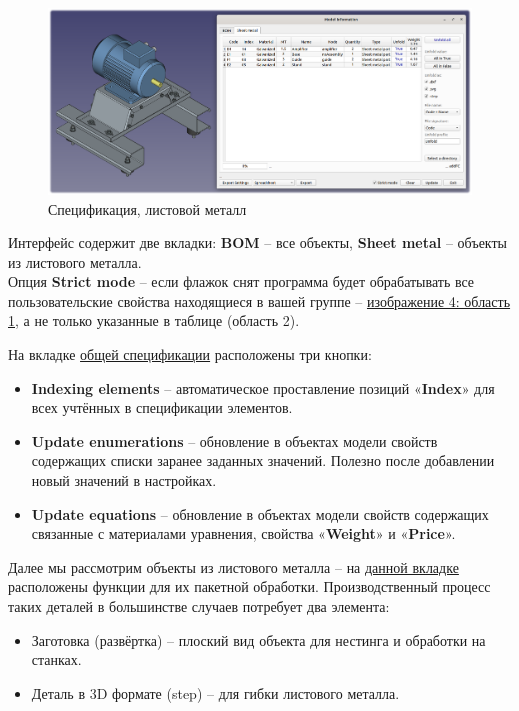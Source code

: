 \documentclass[a4paper,12pt]{article}
\begin{document}
\begin{figure}[htp]
	\centering
	\includegraphics[width=1\textwidth]{img/info_sm.png}
	\caption{Спецификация, листовой металл}
	\label{sec:info_sm}
\end{figure}


Интерфейс содержит две вкладки: \textbf{BOM} -- все объекты, \textbf{Sheet metal} -- объекты из листового металла.\\

Опция \textbf{Strict mode} -- если флажок снят программа будет обрабатывать все пользовательские свойства находящиеся в вашей группе -- \hyperref[sec:pref_uProp]{изображение 4: область 1}, а не только указанные в таблице (область 2).

\pagebreak


На вкладке \hyperref[sec:info_bom]{общей спецификации} расположены три кнопки:
\begin{itemize}
	\item \textbf{Indexing elements} -- автоматическое проставление позиций «\textbf{Index}» для всех учтённых в спецификации элементов.
	\item \textbf{Update enumerations} -- обновление в объектах модели свойств содержащих списки заранее заданных значений. Полезно после добавлении новый значений в настройках.
	\item \textbf{Update equations} -- обновление в объектах модели свойств содержащих связанные с материалами уравнения, свойства «\textbf{Weight}» и «\textbf{Price}».\\
\end{itemize}

Далее мы рассмотрим объекты из листового металла -- на \hyperref[sec:info_sm]{данной вкладке} расположены функции для их пакетной обработки. Производственный процесс таких деталей в большинстве случаев потребует два элемента:
\begin{itemize}
	\item Заготовка (развёртка) -- плоский вид объекта для нестинга и обработки на станках.
	\item Деталь в 3D формате (step) -- для гибки листового металла.
\end{itemize}
\end{document}
